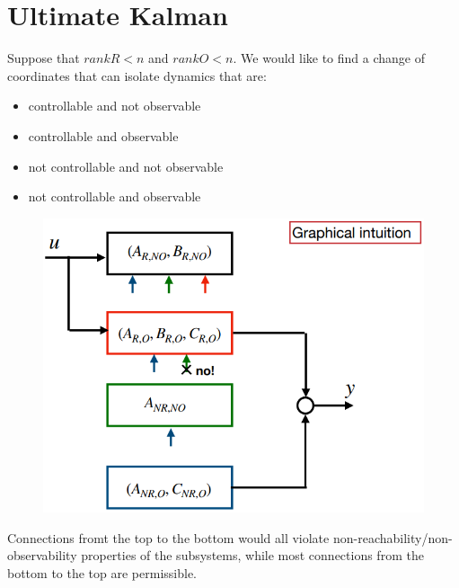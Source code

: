 \documentclass{book}
\theoremstyle{definition}
\theoremstyle{remark}
\theoremstyle{remark}
\begin{document}
\chapter{Ultimate Kalman}
Suppose that $rankR<n$ and $rankO<n$. We would like to find a change of coordinates that can isolate dynamics that are:
\begin{itemize}
    \item controllable and not observable
    \item controllable and observable
    \item not controllable and not observable
    \item not controllable and observable
\end{itemize}
\begin{figure}[H]
    \centering
    \includegraphics[width=0.8\linewidth]{images/Ult_Kalman}
\end{figure}

Connections fromt the top to the bottom would all violate non-reachability/non-observability properties of the subsystems, while most connections from the bottom to the top are permissible.
\end{document}
